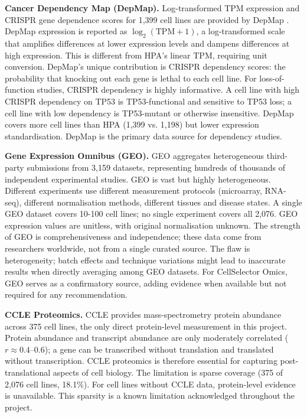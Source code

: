 \documentclass[author={Karen Coutinho, Ishaan Bhalla, Aman Raj, Dixit Kaloorani Malarmannan},
                supervisor={Dr. Daniel D'Andrea},
                degree={MSc},
                title={CellSelector Omics: A Multi-Omics Recommendation System for Cell Line Selection},
                subtitle={},
                type={},
                year={2026}]{dissertation}
\begin{document}
{\bf Cancer Dependency Map (DepMap).} Log-transformed TPM expression and CRISPR gene dependence scores for 1,399 cell lines are provided by DepMap \cite{tsherniak2017depmap}. DepMap expression is reported as $\log_2(\text{TPM}+1)$, a log-transformed scale that amplifies differences at lower expression levels and dampens differences at high expression. This is different from HPA's linear TPM, requiring unit conversion. DepMap's unique contribution is CRISPR dependency scores: the probability that knocking out each gene is lethal to each cell line. For loss-of-function studies, CRISPR dependency is highly informative. A cell line with high CRISPR dependency on TP53 is TP53-functional and sensitive to TP53 loss; a cell line with low dependency is TP53-mutant or otherwise insensitive. DepMap covers more cell lines than HPA (1,399 vs. 1,198) but lower expression standardisation. DepMap is the primary data source for dependency studies.

{\bf Gene Expression Omnibus (GEO).} GEO \cite{barrett2013geo} aggregates heterogeneous third-party submissions from 3,159 datasets, representing hundreds of thousands of independent experimental studies. GEO is vast but highly heterogeneous. Different experiments use different measurement protocols (microarray, RNA-seq), different normalisation methods, different tissues and disease states. A single GEO dataset covers 10-100 cell lines; no single experiment covers all 2,076. GEO expression values are unitless, with original normalisation unknown. The strength of GEO is comprehensiveness and independence; these data come from researchers worldwide, not from a single curated source. The flaw is heterogeneity; batch effects and technique variations might lead to inaccurate results when directly averaging among GEO datasets. For CellSelector Omics, GEO serves as a confirmatory source, adding evidence when available but not required for any recommendation.

{\bf CCLE Proteomics.} CCLE \cite{nusinow2020proteomics} provides mass-spectrometry protein abundance across 375 cell lines, the only direct protein-level measurement in this project. Protein abundance and transcript abundance are only moderately correlated ($r \approx 0.4$--$0.6$); a gene can be transcribed without translation and translated without transcription. CCLE proteomics is therefore essential for capturing post-translational aspects of cell biology. The limitation is sparse coverage (375 of 2,076 cell lines, 18.1\%). For cell lines without CCLE data, protein-level evidence is unavailable. This sparsity is a known limitation acknowledged throughout the project.
\end{document}
